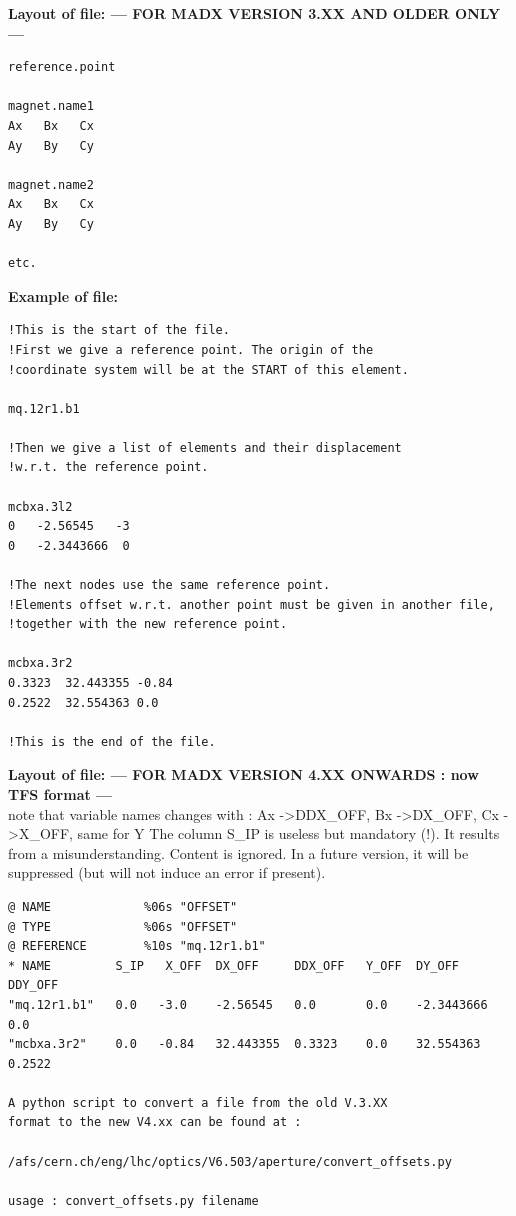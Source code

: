 {\bf Layout of file: --- FOR MADX VERSION 3.XX AND OLDER ONLY--- }
\begin{verbatim}
reference.point

magnet.name1
Ax   Bx   Cx
Ay   By   Cy

magnet.name2
Ax   Bx   Cx
Ay   By   Cy

etc.
\end{verbatim}

{\bf Example of file:}
\begin{verbatim}
!This is the start of the file.
!First we give a reference point. The origin of the 
!coordinate system will be at the START of this element.

mq.12r1.b1

!Then we give a list of elements and their displacement 
!w.r.t. the reference point.

mcbxa.3l2
0   -2.56545   -3
0   -2.3443666  0

!The next nodes use the same reference point.
!Elements offset w.r.t. another point must be given in another file,
!together with the new reference point.

mcbxa.3r2
0.3323  32.443355 -0.84
0.2522  32.554363 0.0

!This is the end of the file.
\end{verbatim}

{\bf Layout of file: --- FOR MADX VERSION 4.XX ONWARDS : now TFS format --- }\\ 
note that variable names changes with : Ax -\textgreater DDX\_OFF,   Bx
-\textgreater DX\_OFF,  Cx -\textgreater X\_OFF, same for Y The column
S\_IP is useless but mandatory (!). It results from a
misunderstanding. Content is ignored. In a future version, it will be
suppressed (but will not induce an error if present).  

\begin{verbatim}
@ NAME             %06s "OFFSET" 
@ TYPE             %06s "OFFSET" 
@ REFERENCE        %10s "mq.12r1.b1" 
* NAME         S_IP   X_OFF  DX_OFF     DDX_OFF   Y_OFF  DY_OFF      DDY_OFF
"mq.12r1.b1"   0.0   -3.0    -2.56545   0.0       0.0    -2.3443666  0.0
"mcbxa.3r2"    0.0   -0.84   32.443355  0.3323    0.0    32.554363   0.2522

A python script to convert a file from the old V.3.XX 
format to the new V4.xx can be found at :

/afs/cern.ch/eng/lhc/optics/V6.503/aperture/convert_offsets.py

usage : convert_offsets.py filename
\end{verbatim}

